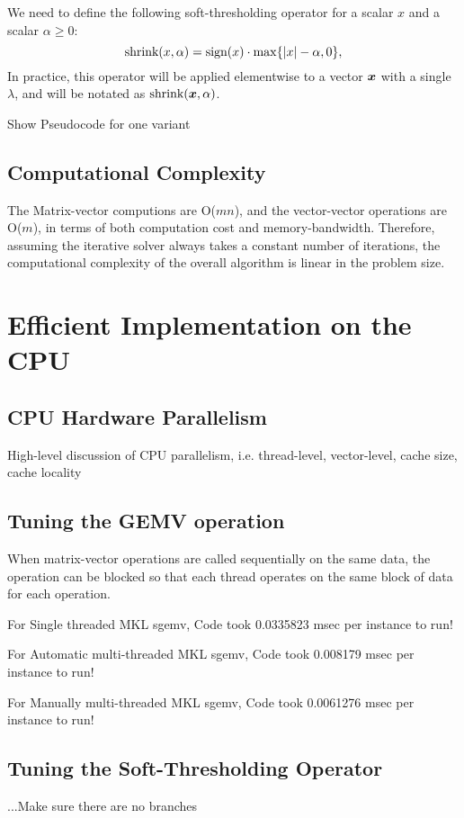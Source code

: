 \documentclass[10pt,twocolumn,letterpaper]{article}
\begin{document}
We need to define the following soft-thresholding operator for a
scalar $x$ and a scalar $\alpha \geq 0$:
\begin{equation}
\textup{shrink}(x,\alpha) = \textup{sign}(x)\cdot \max \{|x| - \alpha, 0\},
\end{equation}
In practice, this operator will be applied elementwise to a vector ${\boldsymbol{x}}$ with a single $\lambda$,
and will be notated as $\textup{shrink}({\boldsymbol{x}},\alpha)$.

Show Pseudocode for one variant
\subsection{Computational Complexity}
The Matrix-vector computions are O($mn$), and the vector-vector operations are O($m$), 
in terms of both computation cost and memory-bandwidth.
Therefore, assuming the iterative solver always takes a constant number of iterations,
the computational complexity of the overall algorithm is linear in the problem size.

\section{Efficient Implementation on the CPU}
\subsection{CPU Hardware Parallelism}
High-level discussion of CPU parallelism, i.e.
thread-level, vector-level, cache size, cache locality
\subsection{Tuning the GEMV operation}
When matrix-vector operations are called sequentially on the same data,
the operation can be blocked so that each thread operates on the same block of data for each operation.

For Single threaded MKL sgemv, Code took          0.0335823 msec per instance to run!

For Automatic multi-threaded MKL sgemv, Code took 0.008179 msec per instance to run!

For Manually multi-threaded MKL sgemv, Code took  0.0061276 msec per instance to run!

\subsection{Tuning the Soft-Thresholding Operator}
...Make sure there are no branches
\end{document}

